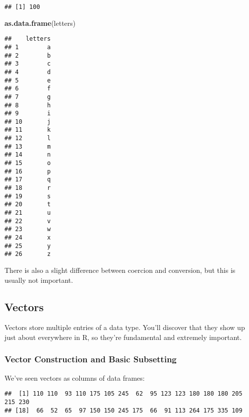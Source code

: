 \documentclass[]{article}
\newenvironment{Shaded}{\begin{snugshade}}{\end{snugshade}}
\newcommand{\KeywordTok}[1]{\textcolor[rgb]{0.13,0.29,0.53}{\textbf{#1}}}
\newcommand{\OperatorTok}[1]{\textcolor[rgb]{0.81,0.36,0.00}{\textbf{#1}}}
\newcommand{\NormalTok}[1]{#1}
\begin{document}
\begin{verbatim}
## [1] 100
\end{verbatim}

\begin{Shaded}
\begin{Highlighting}[]
\KeywordTok{as.data.frame}\NormalTok{(letters)}
\end{Highlighting}
\end{Shaded}

\begin{verbatim}
##    letters
## 1        a
## 2        b
## 3        c
## 4        d
## 5        e
## 6        f
## 7        g
## 8        h
## 9        i
## 10       j
## 11       k
## 12       l
## 13       m
## 14       n
## 15       o
## 16       p
## 17       q
## 18       r
## 19       s
## 20       t
## 21       u
## 22       v
## 23       w
## 24       x
## 25       y
## 26       z
\end{verbatim}

There is also a slight difference between coercion and conversion, but
this is usually not important.

\subsection{Vectors}\label{vectors}

Vectors store multiple entries of a data type. You'll discover that they
show up just about everywhere in R, so they're fundamental and extremely
important.

\subsubsection{Vector Construction and Basic
Subsetting}\label{vector-construction-and-basic-subsetting}

We've seen vectors as columns of data frames:

\begin{Shaded}
\end{Shaded}

\begin{verbatim}
##  [1] 110 110  93 110 175 105 245  62  95 123 123 180 180 180 205 215 230
## [18]  66  52  65  97 150 150 245 175  66  91 113 264 175 335 109
\end{verbatim}
\end{document}
